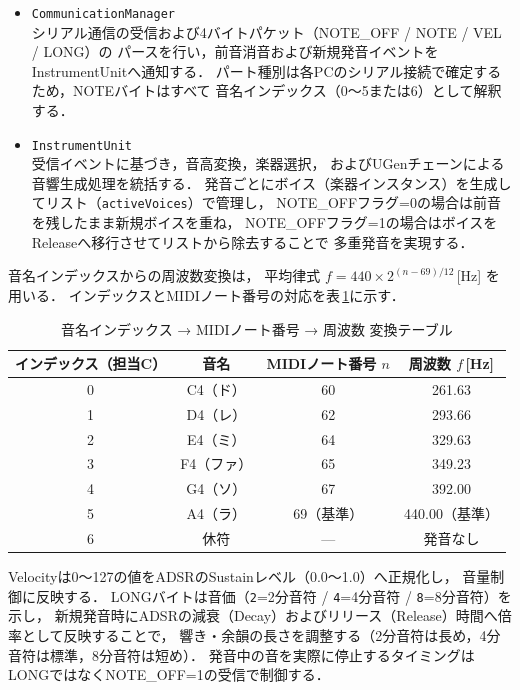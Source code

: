 \begin{itemize}

  \item \texttt{CommunicationManager} \\
  シリアル通信の受信および4バイトパケット（NOTE\_OFF / NOTE / VEL / LONG）の
  パースを行い，前音消音および新規発音イベントをInstrumentUnitへ通知する．
  パート種別は各PCのシリアル接続で確定するため，NOTEバイトはすべて
  音名インデックス（0〜5または6）として解釈する．

  \item \texttt{InstrumentUnit} \\
  受信イベントに基づき，音高変換，楽器選択，
  およびUGenチェーンによる音響生成処理を統括する．
  発音ごとにボイス（楽器インスタンス）を生成してリスト（\texttt{activeVoices}）で管理し，
  NOTE\_OFFフラグ=0の場合は前音を残したまま新規ボイスを重ね，
  NOTE\_OFFフラグ=1の場合はボイスをReleaseへ移行させてリストから除去することで
  多重発音を実現する．

\end{itemize}

音名インデックスからの周波数変換は，
平均律式 $f = 440 \times 2^{(n-69)/12}$\,[Hz] を用いる．
インデックスとMIDIノート番号の対応を表\,\ref{tab:midi_table}に示す．

\begin{table}[H]
  \centering
  \caption{音名インデックス → MIDIノート番号 → 周波数 変換テーブル}
  \label{tab:midi_table}
  \begin{tabular}{cccc}
    \hline
    インデックス（担当C） & 音名 & MIDIノート番号 $n$ & 周波数 $f$\,[Hz] \\
    \hline
    0   & C4（ド） & 60              & 261.63 \\
    1   & D4（レ） & 62              & 293.66 \\
    2   & E4（ミ） & 64              & 329.63 \\
    3   & F4（ファ）& 65             & 349.23 \\
    4   & G4（ソ） & 67              & 392.00 \\
    5   & A4（ラ） & 69（基準）      & 440.00（基準） \\
    \hline
    6   & 休符     & —               & 発音なし \\
    \hline
  \end{tabular}
\end{table}

Velocityは0〜127の値をADSRのSustainレベル（0.0〜1.0）へ正規化し，
音量制御に反映する．
LONGバイトは音価（\texttt{2}=2分音符 / \texttt{4}=4分音符 / \texttt{8}=8分音符）を示し，
新規発音時にADSRの減衰（Decay）およびリリース（Release）時間へ倍率として反映することで，
響き・余韻の長さを調整する（2分音符は長め，4分音符は標準，8分音符は短め）．
発音中の音を実際に停止するタイミングはLONGではなくNOTE\_OFF=1の受信で制御する．

